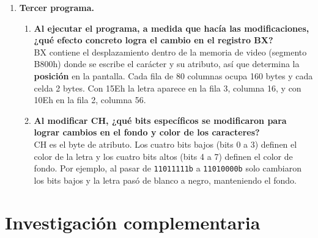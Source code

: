 \documentclass[10pt]{article}
\begin{document}
\begin{enumerate}
\begin{enumerate}
    \item \textbf{¿Por qué al ejecutar la séptima instrucción los datos se almacenan en CX en ese orden específico?}\\
    Porque el 8086 almacena los datos de 16 bits en formato \textit{little endian}: el byte menos significativo va en la dirección menor y el más significativo en la siguiente. Como en 0112h está 61h y en 0113h está 41h, al leer con \texttt{MOV CX, [BX]} el primer byte (61h) pasa a CL y el segundo (41h) a CH, quedando CX = 4161h.
  \end{enumerate}

  \item \textbf{Tercer programa.}
  \begin{enumerate}
    \item \textbf{Al ejecutar el programa, a medida que hacía las modificaciones, ¿qué efecto concreto logra el cambio en el registro BX?}\\
    BX contiene el desplazamiento dentro de la memoria de video (segmento B800h) donde se escribe el carácter y su atributo, así que determina la \textbf{posición} en la pantalla. Cada fila de 80 columnas ocupa 160 bytes y cada celda 2 bytes. Con 15Eh la letra aparece en la fila 3, columna 16, y con 10Eh en la fila 2, columna 56.

    \item \textbf{Al modificar CH, ¿qué bits específicos se modificaron para lograr cambios en el fondo y color de los caracteres?}\\
    CH es el byte de atributo. Los cuatro bits bajos (bits 0 a 3) definen el color de la letra y los cuatro bits altos (bits 4 a 7) definen el color de fondo. Por ejemplo, al pasar de \texttt{11011111b} a \texttt{11010000b} solo cambiaron los bits bajos y la letra pasó de blanco a negro, manteniendo el fondo.
  \end{enumerate}
\end{enumerate}

\section{Investigación complementaria}
\end{document}
